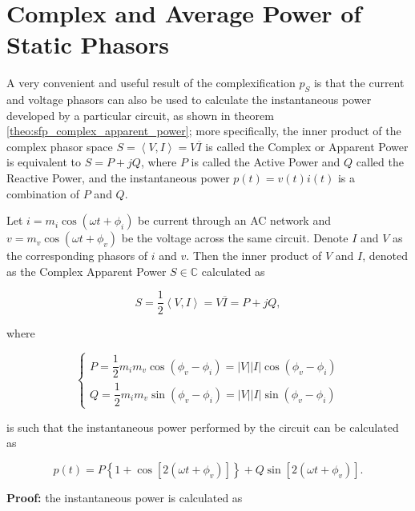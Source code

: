 \section{Complex and Average Power of Static Phasors} %

	A very convenient and useful result of the complexification $p_S$ is that the current and voltage phasors can also be used to calculate the instantaneous power developed by a particular circuit, as shown in theorem \ref{theo:sfp_complex_apparent_power}; more specifically, the inner product of the complex phasor space $S = \left< V,I\right> = V\overline{I}$ is called the Complex or Apparent Power is equivalent to $S = P + jQ$, where $P$ is called the Active Power and $Q$ called the Reactive Power, and the instantaneous power $p(t) = v(t)i(t)$ is a combination of $P$ and $Q$.

\begin{theorem}\label{theo:sfp_complex_apparent_power} %
	Let $i = m_i\cos\left(\omega t + \phi_i\right)$ be current through an AC network and $v = m_v\cos\left(\omega t + \phi_v\right)$ be the voltage across the same circuit. Denote $I$ and $V$ as the corresponding phasors of $i$ and $v$. Then the inner product of $V$ and $I$, denoted as the Complex Apparent Power $S \in \mathbb{C}$ calculated as

\begin{equation} S = \dfrac{1}{2}\left<V,I\right> = V\overline{I} = P + jQ, \label{eq:complex_power_def}\end{equation}

	where

\begin{equation}
\left\{\begin{array}{l}
	P = \dfrac{1}{2}m_im_v\cos\left(\phi_v-\phi_i\right) = \left\lvert V\right\rvert\left\lvert I\right\rvert\cos\left(\phi_v-\phi_i\right) \\[5mm]
	Q = \dfrac{1}{2}m_im_v\sin\left(\phi_v-\phi_i\right) = \left\lvert V\right\rvert\left\lvert I\right\rvert\sin\left(\phi_v-\phi_i\right)
\end{array}\right.
\end{equation}

	is such that the instantaneous power performed by the circuit can be calculated as

\begin{equation} p(t) = P \left\{1 + \cos\left[2\left(\omega t + \phi_v\right)\right] \right\} + Q \sin\left[2\left(\omega t + \phi_v \right)\right] . \end{equation}

\end{theorem}
\textbf{Proof:} the instantaneous power is calculated as

